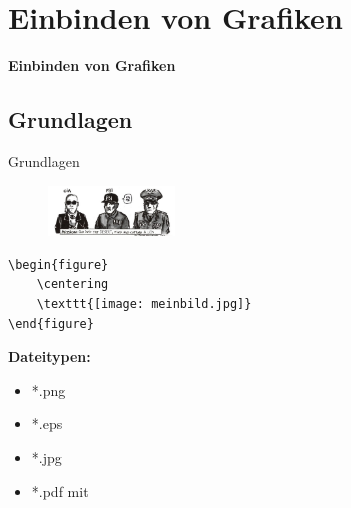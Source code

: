 \documentclass["WS\space 16-17\space -\space LaTeX-Kurs\space -\space Praesentation\space -\space 2.tex"]{subfiles}
\begin{document}
\section{Einbinden von Grafiken}
\begin{frame}[c]
	\begin{center}
		\LARGE \textbf{Einbinden von Grafiken}
	\end{center}
\end{frame}
\subsection{Grundlagen}
\begin{frame}[c]
	\begin{center}
		\large Grundlagen
	\end{center}
\end{frame}
\begin{frame}[fragile]
	\Ausgabe
		\begin{outputbox}
			\begin{figure}
				\centering
				\includegraphics[width=0.3\textwidth]{img/loewenjagd}
			\end{figure}
			\vspace{-0.1cm}
		\end{outputbox}
	\pause
	\Code*
	\begin{lstlisting}
\begin{figure}
	\centering
	\texttt{[image: meinbild.jpg]}
\end{figure}
	\end{lstlisting}

	\pause
	\vspace{-0.1cm}
	\textbf{Dateitypen:}
	\vspace{-0.2cm}
		\begin{itemize}
			\item *.png
			\item *.eps
			\item *.jpg
			\item *.pdf mit \lstinline[basicstyle=\normalfont\ttfamily\normalsize]||
		\end{itemize}
\end{frame}
\end{document}
